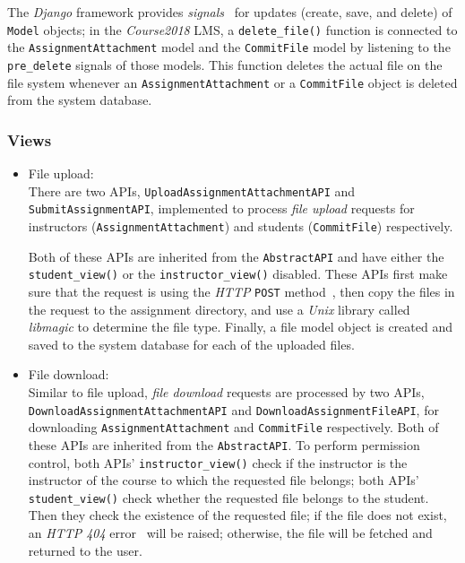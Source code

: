 The \emph{Django} framework provides \emph{signals}~\cite{EdjangoSignal}
for updates (create, save, and delete) of \texttt{Model} objects; in the
\emph{Course2018} LMS, a \texttt{delete\_file()} function is connected to
the \texttt{AssignmentAttachment} model and the \texttt{CommitFile} model by
listening to the \texttt{pre\_delete} signals of those models. This function
deletes the actual file on the file system whenever an
\texttt{AssignmentAttachment} or a \texttt{CommitFile} object is deleted from
the system database.

\subsubsection{Views}
\begin{itemize}
    \item File upload: \\
    There are two APIs, 
    \texttt{Upload\-Assign\-ment\-Attach\-ment\-API} and
    \texttt{Sub\-mit\-Assign\-ment\-API}, 
    implemented to process \emph{file upload} requests
    for instructors (\texttt{Assign\-ment\-Attach\-ment}) and students
    (\texttt{CommitFile}) respectively.

    Both of these APIs are inherited from the 
    \texttt{AbstractAPI} and have either the \texttt{student\_view()}
    or the \texttt{instructor\_view()} disabled.
    These APIs first make sure that the request is using the
    \emph{HTTP} \texttt{POST} method~\citep[Section 4.3.3]{http},
    then copy the files in the request to the assignment directory, and use 
    a \emph{Unix} library called \emph{libmagic} \cite{libmagic} to determine
    the file type.
    Finally, a file model object is created and saved to the system database
    for each of the uploaded files.

    \item File download: \\
    Similar to file upload, \emph{file download} requests are processed by
    two APIs, \texttt{Down\-load\-Assign\-ment\-Attach\-ment\-API} and
    \texttt{Down\-load\-Assign\-ment\-File\-API},
    for downloading \texttt{AssignmentAttachment} and \texttt{CommitFile}
    respectively.
    Both
    of these APIs are inherited from the \texttt{AbstractAPI}\null.
    To perform permission control,
    both APIs' \texttt{instructor\_view()} check if the instructor is the
    instructor of the course to which the requested file belongs; both APIs'
    \texttt{student\_view()} check whether the requested file belongs to the student.
    Then they check the existence of the requested file; if the file
    does not exist, an \emph{HTTP 404} error~\citep[Section 6.5.4]{http} will be
    raised; otherwise, the
    file will be fetched and returned to the user.


\end{itemize}
